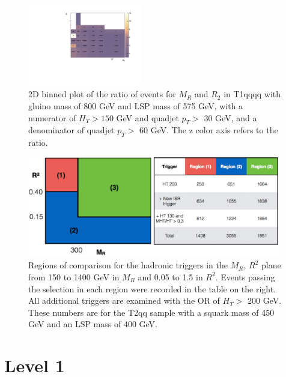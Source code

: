 \documentclass[twocolumn,aps,prd,reprint]{revtex4-1}
\begin{document}
\begin{figure}
 \includegraphics[width=0.45\textwidth]{RATIOquad_ht150_quadcenjet_30_file8.pdf}
\caption{\label{fig:ratio} 2D binned plot of the ratio of events for $M_R$ and $R_2$ in T1qqqq with gluino mass of 800 GeV and LSP mass of 575 GeV, with a numerator of $H_T>150$ GeV and quadjet $p_{T} >$ 30 GeV, and a denominator of quadjet $p_T >$ 60 GeV. The z color axis refers to the ratio.}
\end{figure}
\begin{figure}
 \includegraphics[width=0.98\textwidth]{eff_figure.pdf}
\caption{\label{fig:region} Regions of comparison for the hadronic triggers in the $M_R$, $R^2$ plane from 150 to 1400 GeV in $M_R$ and 0.05 to 1.5 in $R^2$. Events passing the selection in each region were recorded in the table on the right. All additional triggers are examined with the OR of $H_T >$ 200 GeV. These numbers are for the T2qq sample with a squark mass of 450 GeV and an LSP mass of 400 GeV.}
\end{figure}
\section{Level 1}
\end{document}
